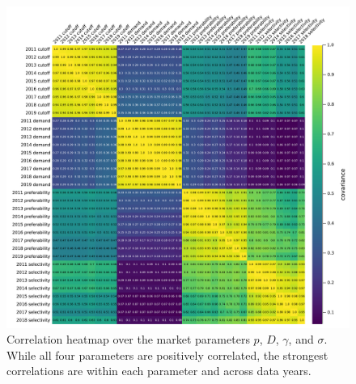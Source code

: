 \documentclass[12pt]{article}
\numberwithin{equation}{subsection}
\theoremstyle{definition}
\begin{document}
\begin{figure}
\begin{center}\includegraphics[width=\linewidth, ]{singlescoreplots/cutoff-demand-gamma-sigma-corr-heatmap.pdf}\end{center}
\captionsetup{singlelinecheck=off}
    \caption[.]{Correlation heatmap over the market parameters $p$, $D$, $\gamma$, and $\sigma$. While all four parameters are positively correlated, the strongest correlations are within each parameter and across data years.}
\label{cutoff-demand-gamma-sigma-corr-heatmap}
\end{figure}
\end{document}
